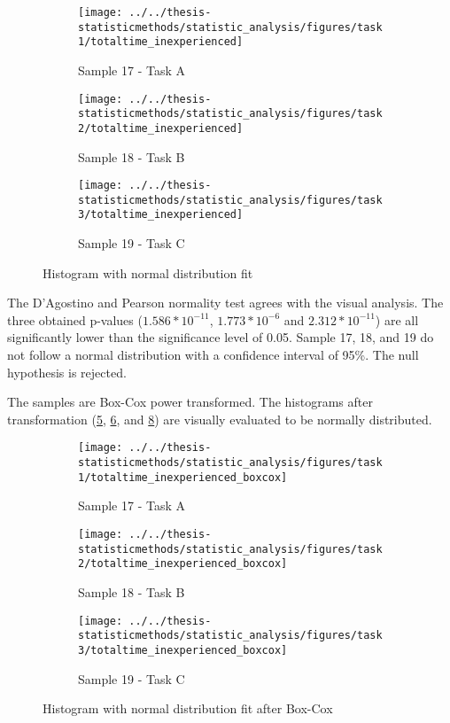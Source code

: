 \begin{appendices}
\begin{figure}[H]
	\centering
	\begin{subfigure}[b]{0.32\textwidth}
		\centering
		\texttt{[image: ../../thesis-statisticmethods/statistic\_analysis/figures/task1/totaltime\_inexperienced]}
		\caption{Sample 17 - Task A}
		\label{fig:totaltimeinexperienced_task1}
	\end{subfigure}
	\begin{subfigure}[b]{0.32\textwidth}
		\centering
		\texttt{[image: ../../thesis-statisticmethods/statistic\_analysis/figures/task2/totaltime\_inexperienced]}
		\caption{Sample 18 - Task B}
		\label{fig:totaltimeinexperienced_task2}
	\end{subfigure}
	\begin{subfigure}[b]{0.32\textwidth}
		\centering
		\texttt{[image: ../../thesis-statisticmethods/statistic\_analysis/figures/task3/totaltime\_inexperienced]}
		\caption{Sample 19 - Task C}
		\label{fig:totaltimeinexperienced_task3}
	\end{subfigure}
	\caption{Histogram with normal distribution fit}
\end{figure}

The D'Agostino and Pearson normality test agrees with the visual analysis. The three obtained p-values ($1.586 * 10^{-11}$, $1.773 * 10^{-6}$ and $2.312 * 10 ^{-11}$) are all significantly lower than the significance level of 0.05. Sample 17, 18, and 19 do not follow a normal distribution with a confidence interval of 95\%. The null hypothesis is rejected. 

The samples are Box-Cox power transformed. The histograms after transformation (\ref{fig:totaltimeinexperiencedboxcox_task1}, \ref{fig:totaltimeinexperiencedboxcox_task2}, and \ref{fig:totaltimeinexperiencedboxcox_task3}) are visually evaluated to be normally distributed. 

\begin{figure}[H]
	\centering
	\begin{subfigure}[b]{0.32\textwidth}
		\centering
		\texttt{[image: ../../thesis-statisticmethods/statistic\_analysis/figures/task1/totaltime\_inexperienced\_boxcox]}
		\caption{Sample 17 - Task A}
		\label{fig:totaltimeinexperiencedboxcox_task1}
	\end{subfigure}
	\begin{subfigure}[b]{0.32\textwidth}
		\centering
		\texttt{[image: ../../thesis-statisticmethods/statistic\_analysis/figures/task2/totaltime\_inexperienced\_boxcox]}
		\caption{Sample 18 - Task B}
		\label{fig:totaltimeinexperiencedboxcox_task2}
	\end{subfigure}
	\begin{subfigure}[b]{0.32\textwidth}
		\centering
		\texttt{[image: ../../thesis-statisticmethods/statistic\_analysis/figures/task3/totaltime\_inexperienced\_boxcox]}
		\caption{Sample 19 - Task C}
		\label{fig:totaltimeinexperiencedboxcox_task3}
	\end{subfigure}
	\caption{Histogram with normal distribution fit after Box-Cox}
\end{figure}


\end{appendices}
